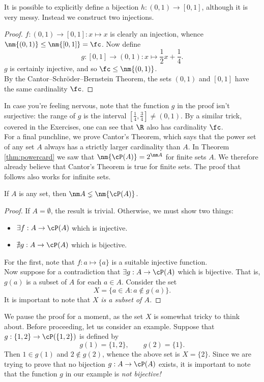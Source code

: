 \noindent It is possible to explicitly define a bijection $h:(0,1)\to[0,1]$, although it is very messy. Instead we construct two injections.

\begin{proof}
$f:(0,1)\to[0,1]:x\mapsto x$ is clearly an injection, whence $\nm{(0,1)}\le\nm{[0,1]}=\fc$. Now define
\[g:[0,1]\to (0,1):x\mapsto \frac 12x+\frac 14.\]
$g$ is certainly injective, and so $\fc\le\nm{(0,1)}$.\\[2pt]
By the Cantor--Schr\"oder--Bernstein Theorem, the sets $(0,1)$ and $[0,1]$ have the same cardinality $\fc$.
\end{proof}

\noindent In case you're feeling nervous, note that the function $g$ in the proof isn't surjective: the range of $g$ is the interval $[\frac 14,\frac 34]\neq (0,1)$. By a similar trick, covered in the Exercises, one can see that $\R$ also has cardinality $\fc$.\\

For a final punchline, we prove Cantor's Theorem, which says that the power set of any set $A$ always has a strictly larger cardinality than $A$. In Theorem \ref{thm:powercard} we saw that $\nm{\cP(A)}=2^{\nm A}$ for finite sets $A$. We therefore already believe that Cantor's Theorem is true for finite sets. The proof that follows also works for infinite sets.

\begin{thm}[Cantor]
If $A$ is any set, then $\nm A\lneq\nm{\cP(A)}$.
\end{thm}

\begin{proof}
If $A=\emptyset$, the result is trivial. Otherwise, we must show two things:
\begin{itemize}
  \item $\exists f:A\to\cP(A)$ which is injective.
  \item $\nexists g:A\to\cP(A)$ which is bijective.
\end{itemize}
For the first, note that $f:a\mapsto\{a\}$ is a suitable injective function.\\
Now suppose for a contradiction that $\exists g:A\to\cP(A)$ which is bijective. That is, $g(a)$ is a subset of $A$ for each $a\in A$. Consider the set
  \[X=\{a\in A:a\not\in g(a)\}.\]
  It is important to note that $X$ \emph{is a subset of $A$.}\phantom\qedhere
\end{proof}
  
\noindent We pause the proof for a moment, as the set $X$ is somewhat tricky to think about. Before proceeding, let us consider an example. Suppose that $g:\{1,2\}\to\cP(\{1,2\})$ is defined by
  \[g(1)=\{1,2\},\qquad g(2)=\{1\}.\]
  Then $1\in g(1)$ and $2\not\in g(2)$, whence the above set is $X=\{2\}$. Since we are trying to prove that no bijection $g:A\to\cP(A)$ exists, it is important to note that the function $g$ in our example is \emph{not bijective!}

